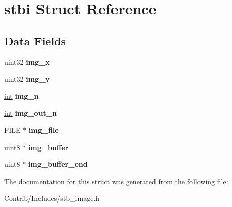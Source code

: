 \hypertarget{structstbi}{}\section{stbi Struct Reference}
\label{structstbi}
\subsection*{Data Fields}
\begin{DoxyCompactItemize}
\item 
uint32 {\bfseries img\+\_\+x}\hypertarget{structstbi_aff509c215214b940cbf5643e069261dd}{}\label{structstbi_aff509c215214b940cbf5643e069261dd}

\item 
uint32 {\bfseries img\+\_\+y}\hypertarget{structstbi_a686fe8380896323a10d29736e0ea1ca9}{}\label{structstbi_a686fe8380896323a10d29736e0ea1ca9}

\item 
\hyperlink{_s_d_l__thread_8h_a6a64f9be4433e4de6e2f2f548cf3c08e}{int} {\bfseries img\+\_\+n}\hypertarget{structstbi_ab18a23def47c13d1da0bc8c00c6ed874}{}\label{structstbi_ab18a23def47c13d1da0bc8c00c6ed874}

\item 
\hyperlink{_s_d_l__thread_8h_a6a64f9be4433e4de6e2f2f548cf3c08e}{int} {\bfseries img\+\_\+out\+\_\+n}\hypertarget{structstbi_aeef1dc53e7febe48cb3191e807f2ef30}{}\label{structstbi_aeef1dc53e7febe48cb3191e807f2ef30}

\item 
F\+I\+LE $\ast$ {\bfseries img\+\_\+file}\hypertarget{structstbi_afe5851dbcce10fa7fda8c80e6bf580d0}{}\label{structstbi_afe5851dbcce10fa7fda8c80e6bf580d0}

\item 
uint8 $\ast$ {\bfseries img\+\_\+buffer}\hypertarget{structstbi_a3a7056b485cc13c2f2638af5e32d1d38}{}\label{structstbi_a3a7056b485cc13c2f2638af5e32d1d38}

\item 
uint8 $\ast$ {\bfseries img\+\_\+buffer\+\_\+end}\hypertarget{structstbi_abb0e59398df57b8b622f41522432067c}{}\label{structstbi_abb0e59398df57b8b622f41522432067c}

\end{DoxyCompactItemize}


The documentation for this struct was generated from the following file\+:\begin{DoxyCompactItemize}
\item 
Contrib/\+Includes/stb\+\_\+image.\+h\end{DoxyCompactItemize}
